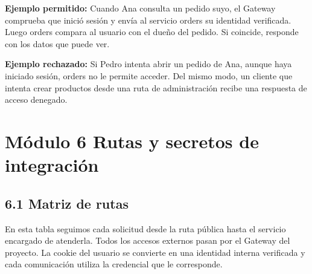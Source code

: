 \documentclass[10pt,letterpaper]{article}
\begin{document}
\textbf{Ejemplo permitido:} Cuando Ana consulta un pedido suyo, el Gateway comprueba que inició sesión y envía al servicio orders su identidad verificada. Luego orders compara al usuario con el dueño del pedido. Si coincide, responde con los datos que puede ver.

\textbf{Ejemplo rechazado:} Si Pedro intenta abrir un pedido de Ana, aunque haya iniciado sesión, orders no le permite acceder. Del mismo modo, un cliente que intenta crear productos desde una ruta de administración recibe una respuesta de acceso denegado.


\section*{Módulo 6 Rutas y secretos de integración}

\subsection*{6.1 Matriz de rutas }
En esta tabla seguimos cada solicitud desde la ruta pública hasta el servicio encargado de atenderla. Todos los accesos externos pasan por el Gateway del proyecto. La cookie del usuario se convierte en una identidad interna verificada y cada comunicación utiliza la credencial que le corresponde.
\end{document}
